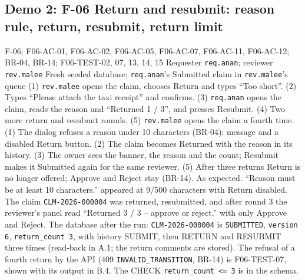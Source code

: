 
\subsection*{Demo 2: F-06 Return and resubmit: reason rule, return, resubmit, return limit}

\demofacts
 {F-06; F06-AC-01, F06-AC-02, F06-AC-05, F06-AC-07, F06-AC-11, F06-AC-12; BR-04, BR-14; F06-TEST-02, 07, 13, 14, 15}
 {Requester \texttt{req.anan}; reviewer \texttt{rev.malee}}
 {Fresh seeded database; \texttt{req.anan}'s Submitted claim in \texttt{rev.malee}'s queue}
 {(1) \texttt{rev.malee} opens the claim, chooses Return and types ``Too short''. (2) Types ``Please attach the taxi receipt'' and confirms. (3) \texttt{req.anan} opens the claim, reads the reason and ``Returned 1 / 3'', and presses Resubmit. (4) Two more return and resubmit rounds. (5) \texttt{rev.malee} opens the claim a fourth time.}
 {(1) The dialog refuses a reason under 10 characters (BR-04): message and a disabled Return button. (2) The claim becomes Returned with the reason in its history. (3) The owner sees the banner, the reason and the count; Resubmit makes it Submitted again for the same reviewer. (5) After three returns Return is no longer offered; Approve and Reject stay (BR-14).}
 {As expected. ``Reason must be at least 10 characters.'' appeared at 9/500 characters with Return disabled. The claim \texttt{CLM-2026-000004} was returned, resubmitted, and after round 3 the reviewer's panel read ``Returned 3 / 3 -- approve or reject.'' with only Approve and Reject.}
 {The database after the run: \texttt{CLM-2026-000004} is \texttt{SUBMITTED}, \texttt{version 6}, \texttt{return\_count 3}, with history SUBMIT, then RETURN and RESUBMIT three times (read-back in A.1; the return comments are stored). The refusal of a fourth return by the API (409 \texttt{INVALID\_TRANSITION}, BR-14) is F06-TEST-07, shown with its output in B.4. The CHECK \texttt{return\_count <= 3} is in the schema.}

